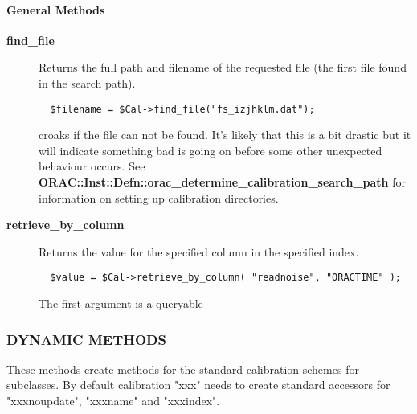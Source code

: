 \paragraph*{General Methods\label{ORAC::Calib_General_Methods}}
\begin{description}

\item[{\textbf{find\_file}}] \mbox{}

Returns the full path and filename of the requested file (the first
file found in the search path).

\begin{verbatim}
  $filename = $Cal->find_file("fs_izjhklm.dat");
\end{verbatim}


croaks if the file can not be found. It's likely that this is a bit
drastic but it will indicate something bad is going on before some
other unexpected behaviour occurs.  See
\textbf{ORAC::Inst::Defn::orac\_determine\_calibration\_search\_path} for
information on setting up calibration directories.


\item[{\textbf{retrieve\_by\_column}}] \mbox{}

Returns the value for the specified column in the specified index.

\begin{verbatim}
  $value = $Cal->retrieve_by_column( "readnoise", "ORACTIME" );
\end{verbatim}


The first argument is a queryable

\end{description}
\subsubsection*{DYNAMIC METHODS\label{ORAC::Calib_DYNAMIC_METHODS}}


These methods create methods for the standard calibration schemes for subclasses.
By default calibration "xxx" needs to create standard accessors for "xxxnoupdate",
"xxxname" and "xxxindex".

